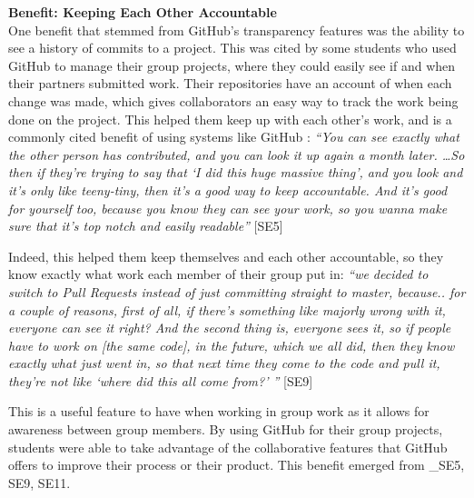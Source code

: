 
\textbf{Benefit: Keeping Each Other Accountable} \\
One benefit that stemmed from GitHub's transparency features was the ability to see a history of commits to a project. This was cited by some students who used GitHub to manage their group projects, where they could easily see if and when their partners submitted work. Their repositories have an account of when each change was made, which gives collaborators an easy way to track the work being done on the project. This helped them keep up with each other's work, and is a commonly cited benefit of using systems like GitHub \cite{dabbish2012social}: \textit{``You can see exactly what the other person has contributed, and you can look it up again a month later. \ldots So then if they're trying to say that `I did this huge massive thing', and you look and it's only like teeny-tiny, then it's a good way to keep accountable. And it's good for yourself too, because you know they can see your work, so you wanna make sure that it's top notch and easily readable''} [SE5]


Indeed, this helped them keep themselves and each other accountable, so they know exactly what work each member of their group put in: \textit{``we decided to switch to Pull Requests instead of just committing straight to master, because.. for a couple of reasons, first of all, if there's something like majorly wrong with it, everyone can see it right? And the second thing is, everyone sees it, so if people have to work on [the same code], in the future, which we all did, then they know exactly what just went in, so that next time they come to the code and pull it, they're not like `where did this all come from?' ''} [SE9]

This is a useful feature to have when working in group work as it allows for awareness between group members. By using GitHub for their group projects, students were able to take advantage of the collaborative features that GitHub offers to improve their process or their product. This benefit emerged from _{SE5, SE9, SE11}.


